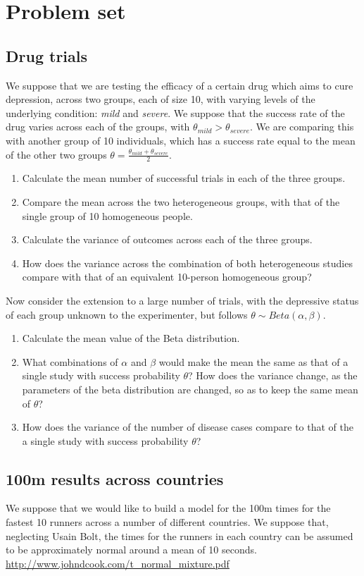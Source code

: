 \documentclass[11pt,fullpage]{book}
\begin{document}
\section{Problem set}
\subsection{Drug trials}
We suppose that we are testing the efficacy of a certain drug which aims to cure depression, across two groups, each of size 10, with varying levels of the underlying condition: \textit{mild} and \textit{severe}. We suppose that the success rate of the drug varies across each of the groups, with $\theta_{mild}>\theta_{severe}$. We are comparing this with another group of 10 individuals, which has a success rate equal to the mean of the other two groups $\theta = \frac{\theta_{mild}+\theta_{severe}}{2}$.

\begin{enumerate}
\item Calculate the mean number of successful trials in each of the three groups.
\item Compare the mean across the two heterogeneous groups, with that of the single group of 10 homogeneous people.
\item Calculate the variance of outcomes across each of the three groups.
\item How does the variance across the combination of both heterogeneous studies compare with that of an equivalent 10-person homogeneous group?
\end{enumerate}

Now consider the extension to a large number of trials, with the depressive status of each group unknown to the experimenter, but follows $\theta\sim Beta(\alpha,\beta)$.

\begin{enumerate}
\item Calculate the mean value of the Beta distribution.
\item What combinations of $\alpha$ and $\beta$ would make the mean the same as that of a single study with success probability $\theta$?
How does the variance change, as the parameters of the beta distribution are changed, so as to keep the same mean of $\theta$?
\item How does the variance of the number of disease cases compare to that of the a single study with success probability $\theta$?
\end{enumerate}

\subsection{100m results across countries}
We suppose that we would like to build a model for the 100m times for the fastest 10 runners across a number of different countries. We suppose that, neglecting Usain Bolt, the times for the runners in each country can be assumed to be approximately normal around a mean of 10 seconds. \url{http://www.johndcook.com/t_normal_mixture.pdf}
\end{document}
